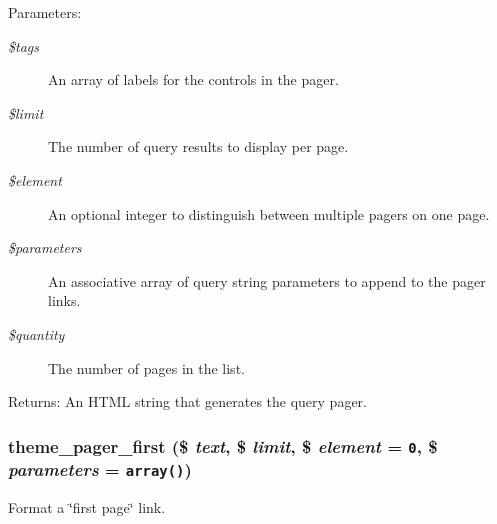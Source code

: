 \begin{Desc}
\item[Parameters:]
\begin{description}
\item[{\em \$tags}]An array of labels for the controls in the pager. \item[{\em \$limit}]The number of query results to display per page. \item[{\em \$element}]An optional integer to distinguish between multiple pagers on one page. \item[{\em \$parameters}]An associative array of query string parameters to append to the pager links. \item[{\em \$quantity}]The number of pages in the list. \end{description}
\end{Desc}
\begin{Desc}
\item[Returns:]An HTML string that generates the query pager. \end{Desc}
\hypertarget{group__themeable_gbbe311616a2243c759c81e3b87ef06bf}{
\subsubsection[{theme\_\-pager\_\-first}]{\setlength{\rightskip}{0pt plus 5cm}theme\_\-pager\_\-first (\$ {\em text}, \/  \$ {\em limit}, \/  \$ {\em element} = {\tt 0}, \/  \$ {\em parameters} = {\tt array()})}}
\label{group__themeable_gbbe311616a2243c759c81e3b87ef06bf}


Format a \char`\"{}first page\char`\"{} link.

